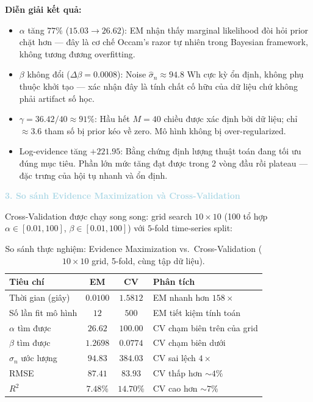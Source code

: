 \textbf{Diễn giải kết quả:}
\begin{itemize}[labelsep=10pt, leftmargin=2cm]
  \item $\alpha$ tăng $77\%$ ($15.03 \to 26.62$): EM nhận thấy
        marginal likelihood đòi hỏi prior chặt hơn --- đây là cơ chế Occam's razor
        tự nhiên trong Bayesian framework, không tương đương overfitting.
  \item $\beta$ không đổi ($\Delta\beta = 0.0008$): Noise $\hat{\sigma}_n \approx 94.8$ Wh
        cực kỳ ổn định, không phụ thuộc khởi tạo --- xác nhận đây là tính chất
        cố hữu của dữ liệu chứ không phải artifact số học.
  \item $\gamma = 36.42/40 \approx 91\%$: Hầu hết $M=40$ chiều được
        xác định bởi dữ liệu; chỉ $\approx 3.6$ tham số bị prior kéo về zero.
        Mô hình không bị over-regularized.
  \item Log-evidence tăng $+221.95$: Bằng chứng định lượng thuật toán
        đang tối ưu đúng mục tiêu. Phần lớn mức tăng đạt được trong 2 vòng đầu
        rồi plateau --- đặc trưng của hội tụ nhanh và ổn định.
\end{itemize}

\noindent\textcolor{lightblue}{\textbf{3. So sánh Evidence Maximization và Cross-Validation}}

Cross-Validation được chạy song song: grid search $10 \times 10$
(100 tổ hợp $\alpha \in [0.01, 100]$, $\beta \in [0.01, 100]$) với
$5$-fold time-series split:

\begin{table}[H]
\centering
\caption{So sánh thực nghiệm: Evidence Maximization vs.\ Cross-Validation
         ($10\!\times\!10$ grid, 5-fold, cùng tập dữ liệu).}
\label{tab:em_vs_cv}
\renewcommand{\arraystretch}{1.4}
\begin{tabular}{l c c l}
  \toprule
  \textbf{Tiêu chí} & \textbf{EM} & \textbf{CV} & \textbf{Phân tích} \\
  \midrule
  Thời gian (giây)          & $0.0100$    & $1.5812$    & EM nhanh hơn $158\times$ \\
  Số lần fit mô hình        & $12$        & $500$       & EM tiết kiệm tính toán \\
  $\alpha$ tìm được         & $26.62$     & $100.00$    & CV chạm biên trên của grid \\
  $\beta$ tìm được          & $1.2698$    & $0.0774$    & CV chạm biên dưới \\
  $\sigma_n$ ước lượng  & $94.83$     & $384.03$    & CV sai lệch $4\times$ \\
  RMSE           & $87.41$     & $83.93$     & CV thấp hơn $\sim 4\%$ \\
  $R^2$              & $7.48\%$    & $14.70\%$   & CV cao hơn $\sim 7\%$ \\
  \bottomrule
\end{tabular}
\end{table}

